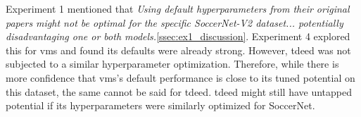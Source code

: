 Experiment 1 mentioned that \textit{Using default hyperparameters from their original papers might not be optimal for the specific SoccerNet-V2 dataset... potentially disadvantaging one or both models.}\autoref{ssec:ex1_discussion}. Experiment 4 explored this for \acrshort{vms} and found its defaults were already strong. However, \acrshort{tdeed} was not subjected to a similar hyperparameter optimization. Therefore, while there is more confidence that \acrshort{vms}'s default performance is close to its tuned potential on this dataset, the same cannot be said for \acrshort{tdeed}. \acrshort{tdeed} might still have untapped potential if its hyperparameters were similarly optimized for SoccerNet.



